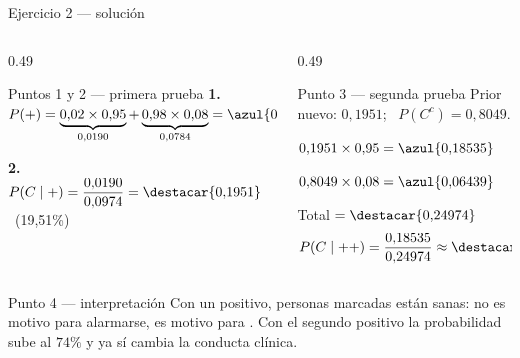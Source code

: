 \documentclass[aspectratio=169,10pt]{beamer}
\begin{document}
\begin{frame}{Ejercicio 2 — solución}
  \scriptsize
  \begin{columns}[T,onlytextwidth]
    \begin{column}{0.49\textwidth}
      \begin{block}{Puntos 1 y 2 — primera prueba}
        \tiny
        \textbf{1.} $P(+) = \underbrace{0{,}02\times 0{,}95}_{0{,}0190}
        + \underbrace{0{,}98\times 0{,}08}_{0{,}0784}
        = \azul{0{,}0974}$

        \vspace{0.1cm}
        \textbf{2.} $P(C\mid +) = \dfrac{0{,}0190}{0{,}0974}
        = \destacar{0{,}1951}$ \ (19,51\%)
      \end{block}
    \end{column}
    \begin{column}{0.49\textwidth}
      \begin{block}{Punto 3 — segunda prueba}
        \tiny
        Prior nuevo: $0{,}1951$; \ $P(C^{c}) = 0{,}8049$.

        \vspace{0.06cm}
        $0{,}1951\times 0{,}95 = \azul{0{,}18535}$

        $0{,}8049\times 0{,}08 = \azul{0{,}06439}$

        Total $= \destacar{0{,}24974}$
        \[ P(C\mid ++) = \frac{0{,}18535}{0{,}24974}
           \approx \destacar{0{,}742} \]
      \end{block}
    \end{column}
  \end{columns}

  \vspace{0.08cm}
  \begin{alertblock}{Punto 4 — interpretación}
    \tiny
    Con un positivo,  personas marcadas están
    sanas: no es motivo para alarmarse, es motivo para . Con
    el segundo positivo la probabilidad sube al $74\%$ y ya sí cambia la
    conducta clínica. 
  \end{alertblock}
\end{frame}

\end{document}
